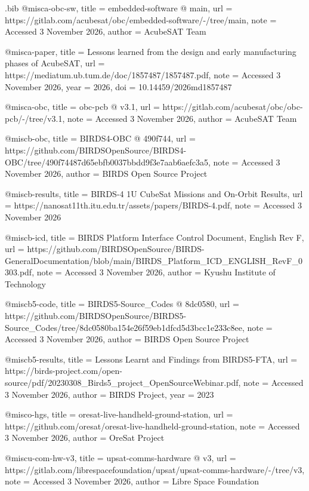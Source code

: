 \begin{filecontents*}[overwrite]{\jobname.bib}
@misc{a-obc-sw,
  title = {{embedded-\allowbreak{}software @ main}},
  url = {https://gitlab.com/acubesat/obc/embedded-software/-/tree/main},
  note = {Accessed 3 November 2026},
  author = {{AcubeSAT Team}}
}

@misc{a-paper,
  title = {{Lessons learned from the design and early manufacturing phases of AcubeSAT}},
  url = {https://mediatum.ub.tum.de/doc/1857487/1857487.pdf},
  note = {Accessed 3 November 2026},
  year = {2026},
  doi = {10.14459/2026md1857487}
}

@misc{a-obc,
  title = {{obc-\allowbreak{}pcb @ v3.1}},
  url = {https://gitlab.com/acubesat/obc/obc-pcb/-/tree/v3.1},
  note = {Accessed 3 November 2026},
  author = {{AcubeSAT Team}}
}

@misc{b-obc,
  title = {{BIRDS4-\allowbreak{}OBC @ 490f744}},
  url = {https://github.com/BIRDSOpenSource/BIRDS4-OBC/tree/490f74487d65ebfb0037bbdd9f3e7aab6aefc3a5},
  note = {Accessed 3 November 2026},
  author = {{BIRDS Open Source Project}}
}

@misc{b-results,
  title = {{BIRDS-\allowbreak{}4 1U CubeSat Missions and On-\allowbreak{}Orbit Results}},
  url = {https://nanosat11th.itu.edu.tr/assets/papers/BIRDS-4.pdf},
  note = {Accessed 3 November 2026}
}

@misc{b-icd,
  title = {{BIRDS Platform Interface Control Document, English Rev F}},
  url = {https://github.com/BIRDSOpenSource/BIRDS-GeneralDocumentation/blob/main/BIRDS_Platform_ICD_ENGLISH_RevF_0303.pdf},
  note = {Accessed 3 November 2026},
  author = {{Kyushu Institute of Technology}}
}

@misc{b5-code,
  title = {{BIRDS5-\allowbreak{}Source\_\allowbreak{}Codes @ 8dc0580}},
  url = {https://github.com/BIRDSOpenSource/BIRDS5-Source_Codes/tree/8dc0580ba154e26f59eb1dfcd5d3bcc1e233c8ee},
  note = {Accessed 3 November 2026},
  author = {{BIRDS Open Source Project}}
}

@misc{b5-results,
  title = {{Lessons Learnt and Findings from BIRDS5-\allowbreak{}FTA}},
  url = {https://birds-project.com/open-source/pdf/20230308_Birds5_project_OpenSourceWebinar.pdf},
  note = {Accessed 3 November 2026},
  author = {{BIRDS Project}},
  year = {2023}
}

@misc{o-hgs,
  title = {{oresat-\allowbreak{}live-\allowbreak{}handheld-\allowbreak{}ground-\allowbreak{}station}},
  url = {https://github.com/oresat/oresat-live-handheld-ground-station},
  note = {Accessed 3 November 2026},
  author = {{OreSat Project}}
}

@misc{u-com-hw-v3,
  title = {{upsat-\allowbreak{}comms-\allowbreak{}hardware @ v3}},
  url = {https://gitlab.com/librespacefoundation/upsat/upsat-comms-hardware/-/tree/v3},
  note = {Accessed 3 November 2026},
  author = {{Libre Space Foundation}}
}


\end{filecontents*}
